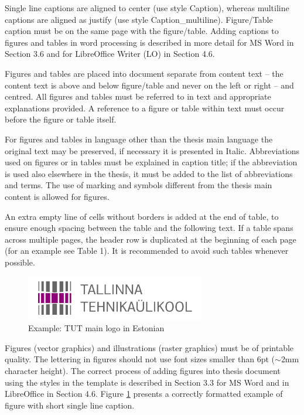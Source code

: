 Single line captions are aligned to center (use style Caption), whereas multiline captions are aligned as justify (use style Caption\_multiline). Figure/Table caption must be on the same page with the figure/table. Adding captions to figures and tables in word processing is described in more detail for MS Word in Section 3.6 and for LibreOffice Writer (LO)
in Section 4.6.

Figures and tables are placed into document separate from content text -- the content text is above and below figure/table and never on the left or right -- and centred. All figures and tables must be referred to in text and appropriate explanations provided. A reference to a figure or table within text must occur before the figure or table itself.

For figures and tables in language other than the thesis main language the original text may be preserved, if necessary it is presented in Italic. Abbreviations used on figures or in tables must be explained in caption title; if the abbreviation is used also elsewhere in the thesis, it must be added to the list of abbreviations and terms. The use of marking and symbols different from the thesis main content is allowed for figures.


An extra empty line of cells without borders is added at the end of table, to ensure enough spacing between the table and the following text. If a table spans across multiple pages,
the header row is duplicated at the beginning of each page (for an example see Table 1). It is recommended to avoid such tables whenever possible.

\begin{figure}[!ht]
\centering
\includegraphics[width=0.7\textwidth]{figures/TTU_peamine_logo_EST_print}
\caption{ Example: TUT main logo in Estonian}
\label{fig:logo}
\end{figure}

Figures (vector graphics) and illustrations (raster graphics) must be of printable quality. The lettering in figures should not use font sizes smaller than 6pt ($\sim$2mm character
height). The correct process of adding figures into thesis document using the styles in the template is described in Section 3.3 for MS Word and in LibreOffice in Section 4.6.
Figure \ref{fig:logo} presents a correctly formatted example of figure with short single line caption.


